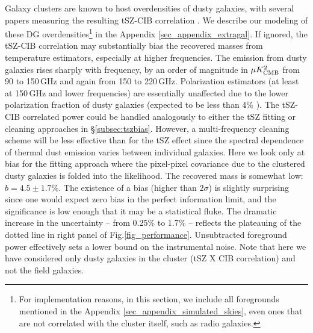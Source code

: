 Galaxy clusters are known to host overdensities of dusty galaxies, with several papers measuring the resulting tSZ-CIB correlation \citep{dunkley13, george15, planck16tsz-cib}.
We describe our modeling of these DG overdensities\footnote{For implementation reasons, in this section, we include all foregrounds mentioned in the Appendix \ref{sec_appendix_simulated_skies}, even ones that are not correlated with the cluster itself, such as radio galaxies.} in the Appendix \ref{sec_appendix_extragal}.
If ignored, the tSZ-CIB correlation may substantially bias the recovered masses from temperature estimators, especially at higher frequencies.
The emission from dusty galaxies rises sharply with frequency, by an order of magnitude in $\mu K^2_{\rm CMB}$ from 90 to 150\,GHz and again from 150 to 220\,GHz.
Polarization estimators (at least at 150\,GHz and lower frequencies) are essentially unaffected due to the lower polarization fraction  of dusty galaxies (expected to be less than 4\% \citep{manzotti17,seiffert07}).
The tSZ-CIB correlated power could be handled analogously to either the tSZ fitting or cleaning approaches in \S\ref{subsec:tszbias}.
However, a multi-frequency cleaning scheme will be less effective than for the tSZ effect since the spectral dependence of thermal dust emission varies between individual galaxies.
Here we look only at bias for the fitting approach where the pixel-pixel covariance due to the clustered dusty galaxies is folded into the likelihood.
The recovered mass is somewhat low: $b=4.5 \pm 1.7\%$.
The existence of a bias (higher than $2\sigma$) is slightly surprising since one would expect zero bias in the perfect information limit, and the significance is low enough that it may be a statistical fluke.
The dramatic increase in the uncertainty -- from 0.25\% to 1.7\% -- reflects the plateauing of the dotted line in right panel of Fig.\ref{fig_performance}.
Unsubtracted foreground power effectively sets a lower bound on the instrumental noise.
Note that here we have considered only dusty galaxies in the cluster (tSZ X CIB correlation) and not the field galaxies.



